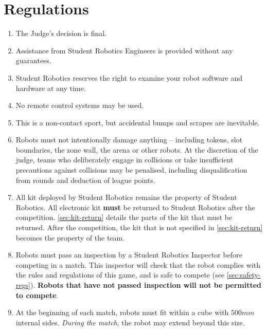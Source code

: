 \section {Regulations}
\label{sec:Regulations}

\begin{enumerate}


\item The Judge's decision is final.
\item Assistance from Student Robotics Engineers is provided without any guarantees.
\item Student Robotics reserves the right to examine your robot software and hardware at any time.


\item No remote control systems may be used.
\item This is a non-contact sport, but accidental bumps and scrapes are inevitable.
\item Robots must not intentionally damage anything -- including tokens, slot boundaries, the zone wall, the arena or other robots.
      At the discretion of the judge, teams who deliberately engage in collisions or take insufficient precautions against collisions may be penalised, including disqualification from rounds and deduction of league points.
\item All kit deployed by Student Robotics remains the property of Student Robotics.
      All electronic kit \textbf{must} be returned to Student Robotics after the competition.
      \autoref{sec:kit-return} details the parts of the kit that must be returned.
      After the competition, the kit that is not specified in \autoref{sec:kit-return} becomes the property of the team.


\item Robots must pass an inspection by a Student Robotics Inspector before competing in a match.
      This inspector will check that the robot complies with the rules and regulations of this game, and is safe to compete (see \autoref{sec:safety-regs}).
      \textbf{Robots that have not passed inspection will not be permitted to compete}.

\item At the beginning of each match, robots must fit within a cube with $500mm$ internal sides.
      \textit{During the match}, the robot may extend beyond this size.


\end{enumerate}
